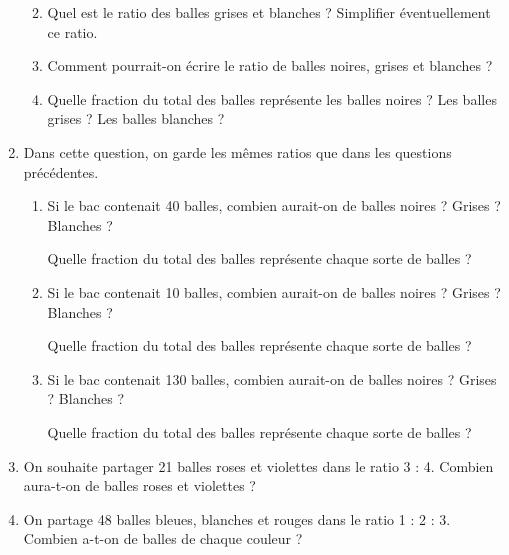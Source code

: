 \begin{activite}
\begin{QCM}
\begin{enumerate}
\begin{enumerate}
                  \pointilles \medskip
               \item Quel est le ratio des balles grises et blanches ? Simplifier éventuellement ce ratio. \par \medskip
                  \pointilles \medskip
               \item Comment pourrait-on écrire le ratio de balles noires, grises et blanches ? \par \medskip
                  \pointilles \medskip
               \item Quelle fraction du total des balles représente les balles noires ? Les balles grises ? Les balles blanches ? \par \medskip
                  \pointilles \medskip
            \end{enumerate}
         \item Dans cette question, on garde les mêmes ratios que dans les questions précédentes.
            \begin{enumerate}
               \item Si le bac contenait 40 balles, combien aurait-on de balles noires ? Grises ? Blanches ? \par \medskip
                  \pointilles \par \medskip
                  Quelle fraction du total des balles représente chaque sorte de balles ? \par \medskip
                  \pointilles \medskip
               \item Si le bac contenait 10 balles, combien aurait-on de balles noires ? Grises ? Blanches ? \par \medskip
                  \pointilles \par \medskip
                  Quelle fraction du total des balles représente chaque sorte de balles ? \par \medskip
                  \pointilles \medskip
               \item Si le bac contenait 130 balles, combien aurait-on de balles noires ? Grises ? Blanches ? \par \medskip
                  \pointilles \par \medskip
            Quelle fraction du total des balles représente chaque sorte de balles ? \par \medskip
                  \pointilles \medskip
            \end{enumerate}
         \item On souhaite partager 21 balles roses et violettes dans le ratio 3 : 4. Combien aura-t-on de balles roses et violettes ? \par \medskip
            \pointilles \medskip
        \item On partage 48 balles bleues, blanches et rouges dans le ratio 1 : 2 : 3. Combien a-t-on de balles de chaque couleur ? \par \medskip
         \pointilles \medskip
      \end{enumerate}
   \end{QCM}
\end{activite}



